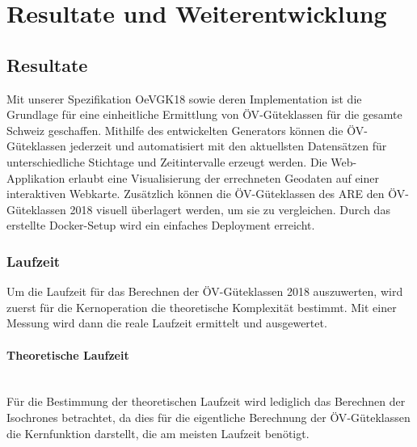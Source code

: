
\section{Resultate und Weiterentwicklung}
\label{Resultate und Weiterentwicklung}


\subsection{Resultate}
\label{Resultate und Weiterentwicklung:Resultate}

Mit unserer Spezifikation \gls{OeVGK18} sowie deren Implementation ist die Grundlage für eine einheitliche Ermittlung von \acs{ÖV}-Güteklassen für die gesamte Schweiz geschaffen.
Mithilfe des entwickelten Generators können die \acs{ÖV}-Güteklassen jederzeit und automatisiert mit den aktuellsten Datensätzen für unterschiedliche Stichtage und Zeitintervalle erzeugt werden.
Die Web-Applikation erlaubt eine Visualisierung der errechneten Geodaten auf einer interaktiven Webkarte.
Zusätzlich können die \acs{ÖV}-Güteklassen des \ac{ARE} den \acs{ÖV}-Güteklassen 2018 visuell überlagert werden, um sie zu vergleichen.
Durch das erstellte Docker-Setup wird ein einfaches Deployment erreicht.


\subsubsection{Laufzeit}
\label{Resultate und Weiterentwicklung:Laufzeit}

Um die Laufzeit für das Berechnen der \acs{ÖV}-Güteklassen 2018 auszuwerten, wird zuerst für die Kernoperation die theoretische Komplexität bestimmt.
Mit einer Messung wird dann die reale Laufzeit ermittelt und ausgewertet.

\paragraph{Theoretische Laufzeit}\label{Laufzeit:Theoretische Laufzeit}~\\
Für die Bestimmung der theoretischen Laufzeit wird lediglich das Berechnen der \glspl{Isochrone} betrachtet, da dies für die eigentliche Berechnung der \acs{ÖV}-Güteklassen die Kernfunktion darstellt, die am meisten Laufzeit benötigt.

